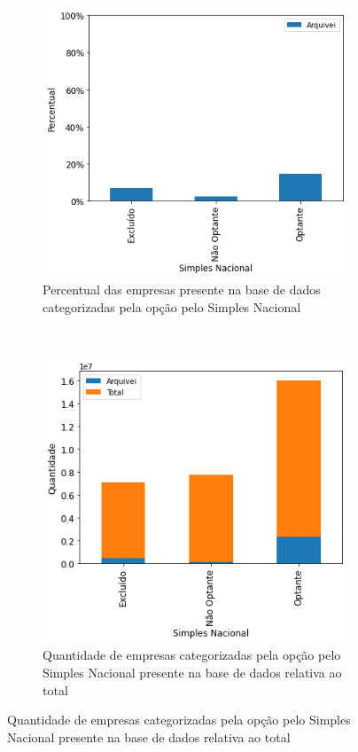 \begin{figure}[htb]
    \centering
    \caption{Participação por região das empresas presentes na base de dados}
    \label{fig:base-de-dados:descritiva-6-presenca-por-simples-nacional}
    \begin{subfigure}[b]{0.45\textwidth} 
        \includegraphics[scale=0.45]{images/base-de-dados-6.1-presenca-por-simples-nacional.png}
        \caption{Percentual das empresas presente na base de dados categorizadas pela opção pelo Simples Nacional}
        \label{fig:base-de-dados:descritiva-6.1-presenca-por-simples-nacional}
    \end{subfigure} ~ \quad
    \begin{subfigure}[b]{0.45\textwidth}
        \includegraphics[scale=0.45]{images/base-de-dados-6.2-qtde-por-simples-nacional.png}
        \caption{Quantidade de empresas categorizadas pela opção pelo Simples Nacional presente na base de dados relativa ao total}
        \label{fig:base-de-dados:descritiva-6.2-qtde-por-simples-nacional}
    \end{subfigure}
    \fdadospesquisa
\end{figure}

